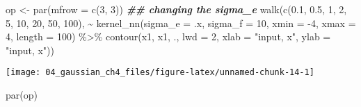 \documentclass[
]{article}
\newenvironment{Shaded}{\begin{snugshade}}{\end{snugshade}}
\newcommand{\AttributeTok}[1]{\textcolor[rgb]{0.77,0.63,0.00}{#1}}
\newcommand{\DecValTok}[1]{\textcolor[rgb]{0.00,0.00,0.81}{#1}}
\newcommand{\DocumentationTok}[1]{\textcolor[rgb]{0.56,0.35,0.01}{\textbf{\textit{#1}}}}
\newcommand{\FloatTok}[1]{\textcolor[rgb]{0.00,0.00,0.81}{#1}}
\newcommand{\FunctionTok}[1]{\textcolor[rgb]{0.00,0.00,0.00}{#1}}
\newcommand{\NormalTok}[1]{#1}
\newcommand{\OtherTok}[1]{\textcolor[rgb]{0.56,0.35,0.01}{#1}}
\newcommand{\SpecialCharTok}[1]{\textcolor[rgb]{0.00,0.00,0.00}{#1}}
\newcommand{\StringTok}[1]{\textcolor[rgb]{0.31,0.60,0.02}{#1}}
\begin{document}
\begin{Shaded}
\begin{Highlighting}[]
\NormalTok{op }\OtherTok{\textless{}{-}} \FunctionTok{par}\NormalTok{(}\AttributeTok{mfrow =} \FunctionTok{c}\NormalTok{(}\DecValTok{3}\NormalTok{, }\DecValTok{3}\NormalTok{))}
\DocumentationTok{\#\# changing the sigma\_e}
\FunctionTok{walk}\NormalTok{(}\FunctionTok{c}\NormalTok{(}\FloatTok{0.1}\NormalTok{, }\FloatTok{0.5}\NormalTok{, }\DecValTok{1}\NormalTok{, }
      \DecValTok{2}\NormalTok{, }\DecValTok{5}\NormalTok{, }\DecValTok{10}\NormalTok{, }
      \DecValTok{20}\NormalTok{, }\DecValTok{50}\NormalTok{, }\DecValTok{100}\NormalTok{),}
    \SpecialCharTok{\textasciitilde{}} \FunctionTok{kernel\_nn}\NormalTok{(}\AttributeTok{sigma\_e =}\NormalTok{ .x,}
                \AttributeTok{sigma\_f =} \DecValTok{10}\NormalTok{,}
                \AttributeTok{xmin =} \SpecialCharTok{{-}}\DecValTok{4}\NormalTok{,}
                \AttributeTok{xmax =} \DecValTok{4}\NormalTok{,}
                \AttributeTok{length =} \DecValTok{100}\NormalTok{) }\SpecialCharTok{\%\textgreater{}\%}
      \FunctionTok{contour}\NormalTok{(x1, x1, .,}
              \AttributeTok{lwd =} \DecValTok{2}\NormalTok{,}
              \AttributeTok{xlab =} \StringTok{"input, x"}\NormalTok{,}
              \AttributeTok{ylab =} \StringTok{"input, x\textquotesingle{}"}\NormalTok{))}
\end{Highlighting}
\end{Shaded}

\begin{center}\texttt{[image: 04\_gaussian\_ch4\_files/figure-latex/unnamed-chunk-14-1]} \end{center}

\begin{Shaded}
\begin{Highlighting}[]
\FunctionTok{par}\NormalTok{(op)}
\end{Highlighting}
\end{Shaded}
\end{document}
